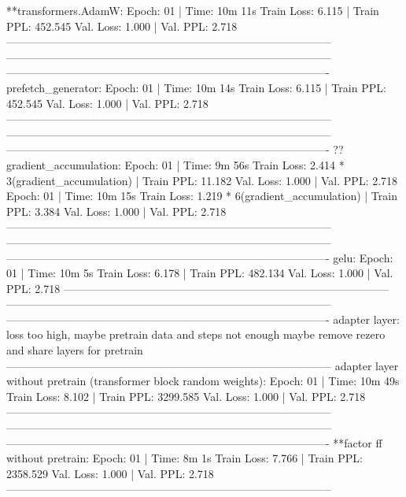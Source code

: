\documentclass[letterpaper]{article} %
\begin{document}
\begin{CJK*}{UTF8}{gbsn}
**transformers.AdamW:
Epoch: 01 | Time: 10m 11s
	Train Loss: 6.115 | Train PPL: 452.545
	 Val. Loss: 1.000 |  Val. PPL:   2.718
-----------------------------------------------------------------------------------------
-----------------------------------------------------------------------------------------
----------------------------------------------------------------------------------------
prefetch_generator:
Epoch: 01 | Time: 10m 14s
	Train Loss: 6.115 | Train PPL: 452.545
	 Val. Loss: 1.000 |  Val. PPL:   2.718
-----------------------------------------------------------------------------------------
-----------------------------------------------------------------------------------------
----------------------------------------------------------------------------------------
??gradient_accumulation:
Epoch: 01 | Time: 9m 56s
	Train Loss: 2.414 * 3(gradient_accumulation) | Train PPL:  11.182
	 Val. Loss: 1.000 |  Val. PPL:   2.718
Epoch: 01 | Time: 10m 15s
        Train Loss: 1.219 * 6(gradient_accumulation) | Train PPL:   3.384
	 Val. Loss: 1.000 |  Val. PPL:   2.718
-----------------------------------------------------------------------------------------
-----------------------------------------------------------------------------------------
----------------------------------------------------------------------------------------
gelu:
Epoch: 01 | Time: 10m 5s
	Train Loss: 6.178 | Train PPL: 482.134
	 Val. Loss: 1.000 |  Val. PPL:   2.718
-----------------------------------------------------------------------------------------
-----------------------------------------------------------------------------------------
----------------------------------------------------------------------------------------
adapter layer:
loss too high, maybe pretrain data and steps not enough
maybe remove rezero and share layers for pretrain
-----------------------------------------------------------------------------------------
adapter layer without pretrain (transformer block random weights):
Epoch: 01 | Time: 10m 49s
	Train Loss: 8.102 | Train PPL: 3299.585
	 Val. Loss: 1.000 |  Val. PPL:   2.718
-----------------------------------------------------------------------------------------
-----------------------------------------------------------------------------------------
----------------------------------------------------------------------------------------
**factor ff without pretrain:
Epoch: 01 | Time: 8m 1s
	Train Loss: 7.766 | Train PPL: 2358.529
	 Val. Loss: 1.000 |  Val. PPL:   2.718
-----------------------------------------------------------------------------------------

\end{CJK*}
\end{document}
